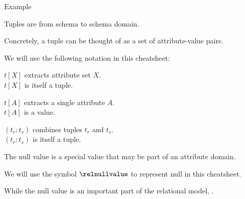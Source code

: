\begin{multicols}{2}
\begin{CheatsheetEntryFrame}
\begin{RelAlgSubsection}{Example}
\begin{center}
        \end{center}
        \end{RelAlgSubsection}

    \end{CheatsheetEntryFrame}

    \begin{CheatsheetEntryFrame}


        Tuples are  from schema to schema domain.

        Concretely, a tuple can be thought of as a set of attribute-value pairs.

        We will use the following notation in this cheatsheet:
        \begin{psmallindent}
            $t[X]$ extracts attribute set $X$. \\[0mm]
            $t[X]$ is itself a tuple.

            $t[A]$ extracts a single attribute $A$. \\[0mm]
            $t[A]$ is a value. 

            $(t_r : t_s)$ combines tuples $t_r$ and $t_s$. \\[0mm]
            $(t_r : t_s)$ is itself a tuple.
        \end{psmallindent}

    \end{CheatsheetEntryFrame}

    \begin{CheatsheetEntryFrame}

         \MarkExtendedRelAlg

        The null value is a special value that may be part of an attribute domain.

        We will use the symbol $\relnullvalue$ to represent null in this cheatsheet.

        While the null value is an important part of the relational model, .

    \end{CheatsheetEntryFrame}





\end{multicols}

